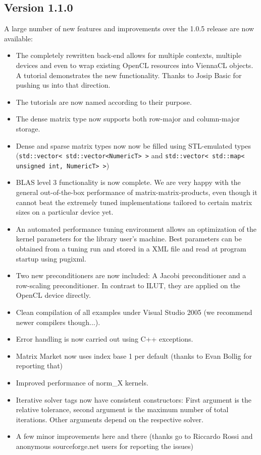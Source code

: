 \subsection*{Version 1.1.0}
A large number of new features and improvements over the 1.0.5 release are now available:
\begin{itemize}
 \item The completely rewritten {\OpenCL} back-end allows for multiple contexts, multiple devices and even to wrap existing OpenCL resources into ViennaCL objects. A tutorial demonstrates the new functionality. Thanks to Josip Basic for pushing us into that direction.
 \item The tutorials are now named according to their purpose.
 \item The dense matrix type now supports both row-major and column-major
storage.
 \item Dense and sparse matrix types now now be filled using STL-emulated types (\lstinline|std::vector< std::vector<NumericT> >| and \lstinline|std::vector< std::map< unsigned int, NumericT> >|)
 \item BLAS level 3 functionality is now complete. We are very happy with the general out-of-the-box performance of matrix-matrix-products, even though it cannot beat the extremely tuned implementations tailored to certain matrix sizes on a particular device yet.
 \item An automated performance tuning environment allows an optimization of the kernel parameters for the library user's machine. Best parameters can be obtained from a tuning run and stored in a XML file and read at program startup using pugixml.
 \item Two new preconditioners are now included: A Jacobi preconditioner and a row-scaling preconditioner. In contrast to ILUT, they are applied on the OpenCL device directly.
 \item Clean compilation of all examples under Visual Studio 2005 (we recommend newer compilers though...).
 \item Error handling is now carried out using C++ exceptions.
 \item Matrix Market now uses index base 1 per default (thanks to Evan Bollig for reporting that)
 \item Improved performance of norm\_X kernels.
 \item Iterative solver tags now have consistent constructors: First argument is the relative tolerance, second argument is the maximum number of total iterations. Other arguments depend on the respective solver.
 \item A few minor improvements here and there (thanks go to Riccardo Rossi and anonymous sourceforge.net users for reporting the issues)
\end{itemize}

